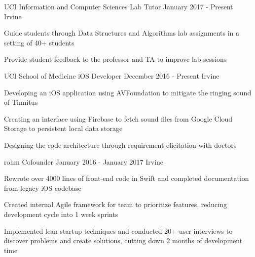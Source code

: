 

\begin{cventries}

  \cventry
    {UCI Information and Computer Sciences} %
    {Lab Tutor} %
    {January 2017 - Present} %
    {Irvine} %
    {
      \begin{cvitems}
      	\item Guide students through Data Structures and Algorithms lab assignments in a setting of 40+ students
      	\item Provide student feedback to the professor and TA to improve lab sessions
      \end{cvitems}
    }

  \cventry
    {UCI School of Medicine} %
    {iOS Developer} %
    {December 2016 - Present} %
    {Irvine} %
    {
      \begin{cvitems} %
        \item Developing an iOS application using AVFoundation to mitigate the ringing sound of Tinnitus
        \item Creating an interface using Firebase to fetch sound files from Google Cloud Storage to persistent local data storage
        \item Designing the code architecture through requirement elicitation with doctors
      \end{cvitems}
    }

  \cventry
    {rohm} %
    {Cofounder} %
    {January 2016 - January 2017} %
    {Irvine} %
    {
      \begin{cvitems} %
        \item Rewrote over 4000 lines of front-end code in Swift and completed documentation from legacy iOS codebase
        \item Created internal Agile framework for team to prioritize features, reducing development cycle into 1 week sprints
        \item Implemented lean startup techniques and conducted 20+ user interviews to discover problems and create solutions, cutting down 2 months of development time
      \end{cvitems}
    }

\end{cventries}
